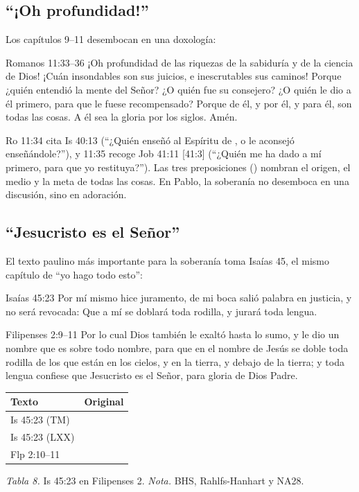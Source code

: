 \subsection{“¡Oh profundidad!”}
Los capítulos 9--11 desembocan en una doxología:

\begin{verso}{Romanos 11:33–36}
¡Oh profundidad de las riquezas de la sabiduría y de la ciencia de Dios! ¡Cuán insondables son sus juicios, e inescrutables sus caminos! Porque ¿quién entendió la mente del Señor? ¿O quién fue su consejero? ¿O quién le dio a él primero, para que le fuese recompensado? Porque de él, y por él, y para él, son todas las cosas. A él sea la gloria por los siglos. Amén.
\end{verso}

Ro 11:34 cita Is 40:13 (``¿Quién enseñó al Espíritu de \SENOR, o le aconsejó enseñándole?''), y 11:35 recoge Job 41:11 [41:3] (``¿Quién me ha dado a mí primero, para que yo restituya?''). Las tres preposiciones () nombran el origen, el medio y la meta de todas las cosas. En Pablo, la soberanía no desemboca en una discusión, sino en adoración.

\subsection{“Jesucristo es el Señor”}
El texto paulino más importante para la soberanía toma Isaías 45, el mismo capítulo de ``yo hago todo esto'':

\begin{verso}{Isaías 45:23}
Por mí mismo hice juramento, de mi boca salió palabra en justicia, y no será revocada: Que a mí se doblará toda rodilla, y jurará toda lengua.
\end{verso}
\begin{verso}{Filipenses 2:9–11}
Por lo cual Dios también le exaltó hasta lo sumo, y le dio un nombre que es sobre todo nombre, para que en el nombre de Jesús se doble toda rodilla de los que están en los cielos, y en la tierra, y debajo de la tierra; y toda lengua confiese que Jesucristo es el Señor, para gloria de Dios Padre.
\end{verso}

\begin{center}\small\renewcommand{\arraystretch}{1.18}
\begin{tabular}{@{}L{2.4cm}L{11.4cm}@{}}
\toprule
\textbf{Texto} & \textbf{Original} \\ \midrule
Is 45:23 (TM) &  \\
Is 45:23 (LXX) &  \\
Flp 2:10--11 &  \\
\bottomrule
\end{tabular}\par
{\footnotesize\color{gris}\textit{Tabla 8.} Is 45:23 en Filipenses 2. \textit{Nota.} BHS, Rahlfs-Hanhart y NA28.}
\end{center}

